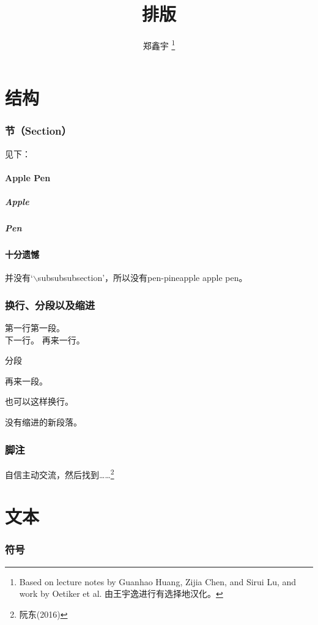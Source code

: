 \documentclass[12pt]{article}
\author{郑鑫宇 \thanks{Based on lecture notes by Guanhao Huang, Zijia Chen, and Sirui Lu, and work by Oetiker et{} al. 由王宇逸进行有选择地汉化。}}
\title{排版}
\begin{document}
\maketitle
\newpage

\tableofcontents
\newpage

\part{结构}

\section{节（Section）}
见下：
\subsection{Apple Pen}
\subsubsection{Apple}
\subsubsection{Pen}
\subsection*{十分遗憾}
并没有`$\backslash$subsubsubsection'，所以没有pen-pineapple apple pen。

\section{换行、分段以及缩进}
第一行第一段。\\
下一行。\newline
\indent 再来一行。

分段\par
再来一段。

也可以这样换行。

\noindent 没有缩进的新段落。

\section{脚注}
自信主动交流，然后找到……\footnote{阮东(2016)}

\part{文本}
\section{符号}\label{sec1}
\end{document}
